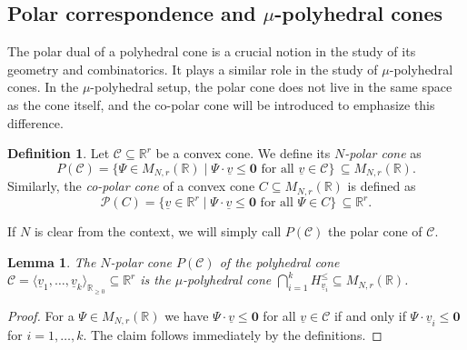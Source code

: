 \documentclass[12pt, a4article]{amsart}   	%
\numberwithin{equation}{section}
\theoremstyle{plain}
\newtheorem{lemma}[theorem]{Lemma}
\theoremstyle{definition}
\newtheorem{example}[theorem]{Example}
\newtheorem{definition}[theorem]{Definition}
\newcommand{\R}{{\mathbb R}}
\newcommand{\bfa}{{\bf a}}
\newcommand{\bfb}{{\bf b}}
\newcommand{\mcC}{{\mathcal C}}
\newcommand{\uv}{{\underline v}}
\begin{document}

\subsection{Polar correspondence and $\mu$-polyhedral cones}

The polar dual of a polyhedral cone is a crucial notion in the study of its geometry and combinatorics. It plays a similar role in the study of $\mu$-polyhedral cones. In the $\mu$-polyhedral setup, the polar cone does not live in the same space as the cone itself, and the co-polar cone will be introduced to emphasize this difference.

\begin{definition}\label{def:polar}\rm
Let $\mcC\subseteq \mathbb R^r$ be a convex cone. We define its \emph{$N$-polar cone} as 
\[
P(\mcC)=\{\Psi\in M_{N,r}(\mathbb R)\mid \Psi\cdot \uv\le \mathbf 0 \text{ for all }\uv\in \mcC\}\,\subseteq M_{N,r}(\mathbb R).
\]
Similarly, the \emph{co-polar cone} of a convex cone $C\subseteq M_{N,r}(\mathbb R)$ is defined as
\[
\mathcal P(C)=\{\uv\in \mathbb{R}^r\mid \Psi\cdot \uv\le \mathbf 0\text{ for all } \Psi\in C\}\,\subseteq \mathbb{R}^r.
\]
\end{definition}

If $N$ is clear from the context, we will simply call $P(\mcC)$ the polar cone of $\mcC$.

\begin{lemma}\label{lem:polyhedral:cone2}
The $N$-polar cone $P(\mcC)$ of the polyhedral cone 
$ \mcC=\langle \uv_1,\ldots, \uv_k\rangle_{\R_ {\geq 0}}\subseteq \mathbb R^r$ is the $\mu$-polyhedral cone 
$\bigcap_{i=1}^k H_{\uv_i}^\leq\subseteq M_{N,r}(\mathbb R)$.
\end{lemma}
\begin{proof}
For a $\Psi\in M_{N,r}(\mathbb R)$ we have $\Psi\cdot\uv\leq \mathbf 0$ for all $\uv\in\mcC$ if and only if 
 $\Psi\cdot\uv_i\leq \mathbf 0$  for $i=1,\ldots,k$.  The  claim  follows immediately by the definitions.
\end{proof}

%
\end{document}

